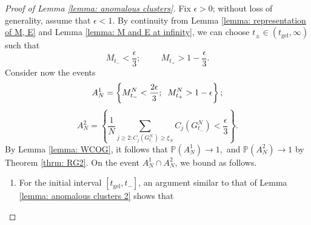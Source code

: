 \begin{proof}[Proof of Lemma \ref{lemma: anomalous clusters}] Fix $\epsilon >0$; without loss of generality, assume that $\epsilon<1.$ By continuity from Lemma \ref{lemma: representation of M, E} and Lemma \ref{lemma: M and E at infinity}, we can choose $t_\pm \in (t_\text{gel}, \infty)$ such that \begin{equation}
    M_{t_-}<\frac{\epsilon}{3};\hspace{1cm}M_{t_+}>1-\frac{\epsilon}{3}.
\end{equation} Consider now the events \begin{equation}
    A^1_N=\left\{M^N_{t_-}<\frac{2\epsilon}{3}; \hspace{0.2cm} M^N_{t_+}>1-\epsilon \right\};
\end{equation} \begin{equation}
    A^2_N=\left\{\frac{1}{N}\sum_{j\geq 2: C_j(G^N_{t_-})\geq \xi_N} C_j(G^N_{t_-})<\frac{\epsilon}{3} \right\}.
\end{equation} By Lemma \ref{lemma: WCOG}, it follows that $\mathbb{P}(A^1_N)\rightarrow 1, $ and $\mathbb{P}(A^2_N)\rightarrow 1$ by Theorem \ref{thrm: RG2}. On the event $A^1_N \cap A^2_N$, we bound as follows. 
\begin{enumerate}[label=\roman{*}).]
    \item For the initial interval $[t_\text{gel}, t_-]$, an argument similar to that of Lemma \ref{lemma: anomalous clusters 2} shows that
 

\end{enumerate}
\end{proof}
